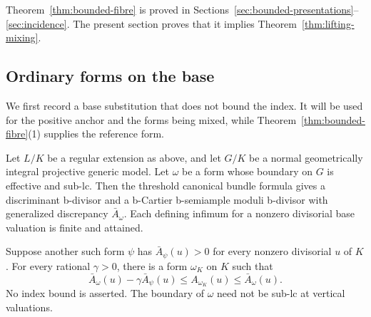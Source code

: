 Theorem~\ref{thm:bounded-fibre} is proved in
Sections~\ref{sec:bounded-presentations}--\ref{sec:incidence}.
The present section proves that it implies
Theorem~\ref{thm:lifting-mixing}.

\subsection{Ordinary forms on the base}

We first record a base substitution that does not bound the index.
It will be used for the positive anchor and the forms being mixed,
while Theorem~\ref{thm:bounded-fibre}(1) supplies the reference form.

\begin{lemma}
\label{tower:base-substitution}
Let $L/K$ be a regular extension as above, and let $G/K$ be a
normal geometrically integral projective generic model.
Let $\omega$ be a form whose boundary
on $G$ is effective and sub-lc.  Then the threshold canonical
bundle formula gives a discriminant b-divisor and a b-Cartier
b-semiample moduli b-divisor with generalized discrepancy
$\bar A_\omega$.  Each defining infimum for a nonzero divisorial
base valuation is finite and attained.

Suppose another such form $\psi$ has
$\bar A_\psi(u)>0$ for every nonzero divisorial $u$ of $K$.
For every rational $\gamma>0$, there is a form $\omega_K$ on $K$
such that
\begin{equation}
\label{tower:substitution-bounds}
 \bar A_\omega(u)-\gamma\bar A_\psi(u)
 \le A_{\omega_K}(u)\le\bar A_\omega(u).
\end{equation}
No index bound is asserted.  The boundary of $\omega$ need not be
sub-lc at vertical valuations.
\end{lemma}

